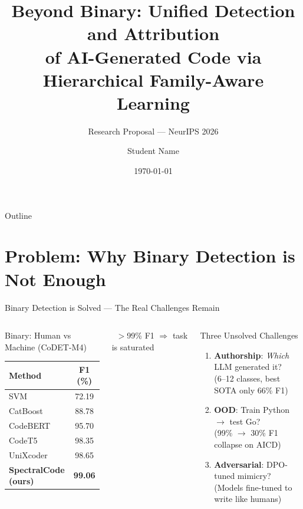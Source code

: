 \documentclass[aspectratio=169, 10pt]{beamer}
\title[AI Code Detection]{%
  \textbf{Beyond Binary: Unified Detection and Attribution\\
  of AI-Generated Code via Hierarchical Family-Aware Learning}}
\subtitle{Research Proposal --- NeurIPS 2026}
\author{Student Name}
\institute{University Name}
\date{\today}
\begin{document}
\begin{frame}
\titlepage
\end{frame}

\begin{frame}{Outline}
\tableofcontents
\end{frame}


\section{Problem: Why Binary Detection is Not Enough}

\begin{frame}{Binary Detection is Solved --- The Real Challenges Remain}
\vspace{-0.2cm}
\begin{columns}[T]
\begin{block}{Binary: Human vs Machine (CoDET-M4)}
\centering\footnotesize
\begin{tabular}{lc}
\toprule
\textbf{Method} & \textbf{F1 (\%)} \\
\midrule
SVM & 72.19 \\
CatBoost & 88.78 \\
CodeBERT & 95.70 \\
CodeT5 & 98.35 \\
UniXcoder & 98.65 \\
\rowcolor{oursgreen}
\textbf{SpectralCode (ours)} & \textbf{99.06} \\
\bottomrule
\end{tabular}
\end{block}
\vspace{0.05cm}
{\small \faExclamationTriangle\ $>$99\% F1 $\Rightarrow$ \alert{task is saturated}}

\begin{alertblock}{Three Unsolved Challenges}
\small
\begin{enumerate}\setlength\itemsep{4pt}
    \item[\faUsers] \textbf{Authorship}: \emph{Which} LLM generated it? \\
    {\scriptsize (6--12 classes, best SOTA only 66\% F1)}
    \item[\faGlobeAmericas] \textbf{OOD}: Train Python $\to$ test Go? \\
    {\scriptsize (99\% $\to$ 30\% F1 collapse on AICD)}
    \item[\faShieldAlt] \textbf{Adversarial}: DPO-tuned mimicry? \\
    {\scriptsize (Models fine-tuned to write like humans)}
\end{enumerate}
\end{alertblock}
\end{columns}

\vspace{0.1cm}
\centering
{}
\end{frame}
\end{document}
